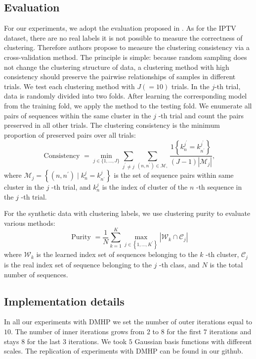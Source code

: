 \documentclass[10pt]{article}
\begin{document}
\subsection{Evaluation}
For our experiments, we adopt the evaluation proposed in \cite{123dirichlet}. As for the IPTV dataset, there are no real labels it is not possible to measure the correctness of clustering. Therefore authors propose to measure the clustering consistency via a cross-validation method. The principle is simple: because random sampling does not change the clustering structure of data, a clustering method with high consistency should preserve the pairwise relationships of samples in different trials. We test each clustering method with $J(=10)$ trials. In the $j$-th trial, data is randomly divided into two folds. After learning the corresponding model from the training fold, we apply the method to the testing fold. We enumerate all pairs of sequences within the same cluster in the $j$ -th trial and count the pairs preserved in all other trials. The clustering consistency is the minimum proportion of preserved pairs over all trials:
$$
\text { Consistency }=\min _{j \in\{1, \ldots, J\}} \sum_{j^{\prime} \neq j} \sum_{\left(n, n^{\prime}\right) \in \mathcal{M},} \frac{1\left\{k_{n}^{j^{\prime}}=k_{n^{\prime}}^{j^{\prime}}\right\}}{(J-1)\left|\mathcal{M}_{j}\right|},
$$
where $\mathcal{M}_{j}=\left\{\left(n, n^{\prime}\right) \mid k_{n}^{j}=k_{n^{\prime}}^{j}\right\}$ is the set of sequence pairs within same cluster in the $j$ -th trial, and $k_{n}^{j}$ is the index of cluster of the $n$ -th sequence in the $j$ -th trial.

For the synthetic data with clustering labels, we use clustering purity to evaluate various methods:
$$
\text { Purity }=\frac{1}{N} \sum_{k=1}^{K} \max _{j \in\left\{1, \ldots, K^{\prime}\right\}}\left|\mathcal{W}_{k} \cap \mathcal{C}_{j}\right|
$$
where $\mathcal{W}_{k}$ is the learned index set of sequences belonging to the $k$ -th cluster, $\mathcal{C}_{j}$ is the real index set of sequence belonging to the $j$ -th class, and $N$ is the total number of sequences.

\subsection{Implementation details}
In all our experiments with DMHP we set the number of outer iterations equal to $10$. The number of inner iterations grows from $2$ to $8$ for the first $7$ iterations and stays $8$ for the last $3$ iterations. We took $5$ Gaussian basis functions with different scales. The replication of experiments with DMHP can be found in our github. 
\end{document}
